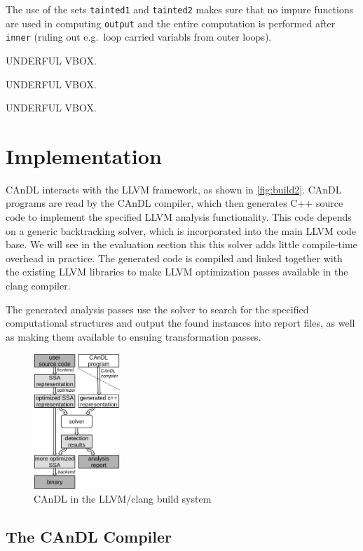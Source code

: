     The use of the sets \texttt{tainted1} and \texttt{tainted2} makes sure that
    no impure functions are used in computing \texttt{output} and the entire
    computation is performed after \texttt{inner} (ruling out e.g.\ loop carried
    variabls from outer loops).

    UNDERFUL VBOX.

    UNDERFUL VBOX.

    UNDERFUL VBOX.

\section{Implementation}

    CAnDL interacts with the LLVM framework, as shown in \autoref{fig:build2}.
    CAnDL programs are read by the CAnDL compiler, which then generates C++
    source code to implement the specified LLVM analysis functionality.
    This code depends on a generic backtracking solver, which is incorporated
    into the main LLVM code base. 
    We will see in the evaluation section this this solver adds little
    compile-time overhead in practice.
    The generated code is compiled and linked together with the existing LLVM
    libraries to make LLVM optimization passes available in the clang compiler.

    The generated analysis passes use the solver to search for the specified
    computational structures and output the found instances into report files,
    as well as making them available to ensuing transformation passes.

\begin{figure}[ht]
\centering
\includegraphics[width=0.29\textwidth]{figures/compilerFlow2.pdf}
\caption{CAnDL in the LLVM/clang build system}
\label{fig:build2}
\end{figure}

\subsection{The CAnDL Compiler}

